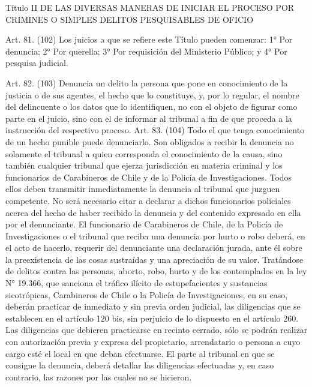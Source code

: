   Título II
  DE LAS DIVERSAS MANERAS DE INICIAR EL PROCESO POR
CRIMINES O SIMPLES DELITOS PESQUISABLES DE OFICIO

    Art. 81. (102) Los juicios a que se refiere este Título pueden comenzar:
    1° Por denuncia;
    2° Por querella;
    3° Por requisición del Ministerio Público; y
    4° Por pesquisa judicial.

    Art. 82. (103) Denuncia un delito la persona que pone en conocimiento de la justicia o de sus agentes, el hecho que lo constituye, y, por lo regular, el nombre del delincuente o los datos que lo identifiquen, no con el objeto de figurar como parte en el juicio, sino con el de informar al tribunal a fin de que proceda a la instrucción del respectivo proceso.
    Art. 83. (104) Todo el que tenga conocimiento de un hecho punible puede denunciarlo.
    Son obligados a recibir la denuncia no solamente el tribunal a quien corresponda el conocimiento de la causa, sino también cualquier tribunal que ejerza jurisdicción en materia criminal y los funcionarios de Carabineros de Chile y de la Policía de Investigaciones. Todos ellos deben transmitir inmediatamente la denuncia al tribunal que juzguen competente.
    No será necesario citar a declarar a dichos funcionarios policiales acerca del hecho de haber recibido la denuncia y del contenido expresado en ella por el denunciante.
    El funcionario de Carabineros de Chile, de la Policía de Investigaciones o el tribunal que reciba una denuncia por hurto o robo deberá, en el acto de hacerlo, requerir del denunciante una declaración jurada, ante él sobre la preexistencia de las cosas sustraídas y una apreciación de su valor.
  Tratándose de delitos contra las personas, aborto, robo, hurto y de los contemplados en la ley N° 19.366, que sanciona el tráfico ilícito de estupefacientes y sustancias sicotrópicas, Carabineros de Chile o la Policía de Investigaciones, en su caso, deberán practicar de inmediato y sin previa orden judicial, las diligencias que se establecen en el artículo 120 bis, sin perjuicio de lo dispuesto en el artículo 260. Las diligencias que debieren practicarse en recinto cerrado, sólo se podrán realizar con autorización previa y expresa del propietario, arrendatario o persona a cuyo cargo esté el local en que deban efectuarse. El parte al tribunal en que se consigne la denuncia, deberá detallar las diligencias efectuadas y, en caso contrario, las razones por las cuales no se hicieron.

